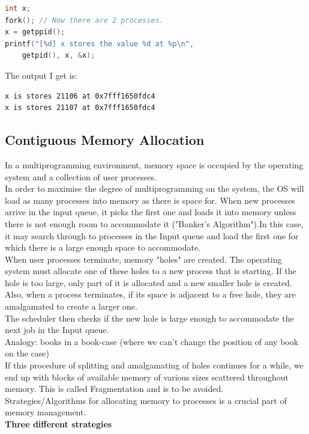 \documentclass[a4paper, 10pt]{article}
\begin{document}
\begin{lstlisting}[language=C]
int x;
fork(); // Now there are 2 processes.
x = getppid();
printf("[%d] x stores the value %d at %p\n",
    getpid(), x, &x);
\end{lstlisting}

The output I get is:
\begin{verbatim}
x is stores 21106 at 0x7fff1650fdc4
x is stores 21107 at 0x7fff1650fdc4
\end{verbatim}

\subsection{Contiguous Memory Allocation}
In a multiprogramming environment, memory space is occupied by the operating system and a collection of user processes. \\[2ex]
In order to maximise the degree of multiprogramming on the system, the OS will load as many processes into memory as there is space for. When new processes arrive in the input queue, it picks the first one and loads it into memory unless there is not enough room to accommodate it ("Banker's Algorithm").In this case, it may search through to processes in the Input queue and load the first one for which there is a large enough space to accommodate. \\[2ex]
When user processes terminate, memory "holes" are created. The operating system must allocate one of these holes to a new process that is starting. If the hole is too large, only part of it is allocated and a new smaller hole is created. Also, when a process terminates, if its space is adjacent to a free hole, they are amalgamated to create a larger one. \\[2ex]
The scheduler then checks if the new hole is large enough to accommodate the next job in the Input queue. \\[2ex]
Analogy: books in a book-case (where we can't change the position of any book on the case) \\[2ex]
If this procedure of splitting and amalgamating of holes continues for a while, we end up with blocks of available memory of various sizes scattered throughout memory. This is called Fragmentation and is to be avoided.  \\[2ex]
Strategies/Algorithms for allocating memory to processes is a crucial part of memory management.\\[2ex]
\textbf{Three different strategies}
\end{document}
